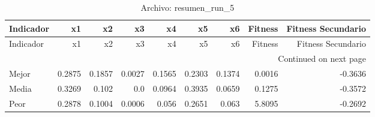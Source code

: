 \begin{longtable}{lrrrrrrrr}
\caption{Archivo: resumen\_run\_5}\label{tab:resumen_run_5} \\
\toprule
Indicador & x1 & x2 & x3 & x4 & x5 & x6 & Fitness & Fitness Secundario \\
\midrule
\endfirsthead
\toprule
Indicador & x1 & x2 & x3 & x4 & x5 & x6 & Fitness & Fitness Secundario \\
\midrule
\endhead
\midrule
\multicolumn{9}{r}{Continued on next page} \\
\midrule
\endfoot
\bottomrule
\endlastfoot
Mejor & 0.2875 & 0.1857 & 0.0027 & 0.1565 & 0.2303 & 0.1374 & 0.0016 & -0.3636 \\
Media & 0.3269 & 0.102 & 0.0 & 0.0964 & 0.3935 & 0.0659 & 0.1275 & -0.3572 \\
Peor & 0.2878 & 0.1004 & 0.0006 & 0.056 & 0.2651 & 0.063 & 5.8095 & -0.2692 \\
\end{longtable}